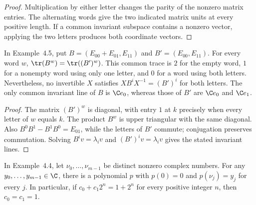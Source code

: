 \begin{proof}
    \leanok
    Multiplication by either letter changes the parity of the nonzero matrix
    entries. The alternating words give the two indicated matrix units at
    every positive length. If a common invariant subspace contains a nonzero
    vector, applying the two letters produces both coordinate vectors.
\end{proof}

\begin{lemma}
    \label{lem:asym_example_no_gauge}
    \leanok
    In Example~4.5, put $B=(E_{00}+E_{01},E_{11})$ and
    $B'=(E_{00},E_{11})$.
    For every word $w$, $\tr(B^w)=\tr((B')^w)$. This common trace is $2$ for
    the empty word, $1$ for a nonempty word using only one letter, and $0$ for
    a word using both letters. Nevertheless, no invertible $X$ satisfies
    $XB^iX^{-1}=(B')^i$ for both letters. The only common invariant line of
    $B$ is $\C e_0$, whereas those of $B'$ are $\C e_0$ and $\C e_1$.
\end{lemma}

\begin{proof}
    \leanok
    The matrix $(B')^w$ is diagonal, with entry $1$ at $k$ precisely when every
    letter of $w$ equals $k$. The product $B^w$ is upper triangular with the
    same diagonal. Also $B^0B^1-B^1B^0=E_{01}$, while the letters of $B'$ commute;
    conjugation preserves commutation. Solving $B^iv=\lambda_i v$ and
    $(B')^iv=\lambda_i v$ gives the stated invariant lines.
\end{proof}

\begin{lemma}
    \label{lem:asym_example_interpolation}
    \leanok
    In Example~4.4, let $\nu_0,\ldots,\nu_{m-1}$ be distinct nonzero complex numbers. For any
    $y_0,\ldots,y_{m-1}\in\C$, there is a polynomial $p$ with $p(0)=0$ and
    $p(\nu_j)=y_j$ for every $j$. In particular, if $c_0+c_1 2^n=1+2^n$ for
    every positive integer $n$, then $c_0=c_1=1$.
\end{lemma}

